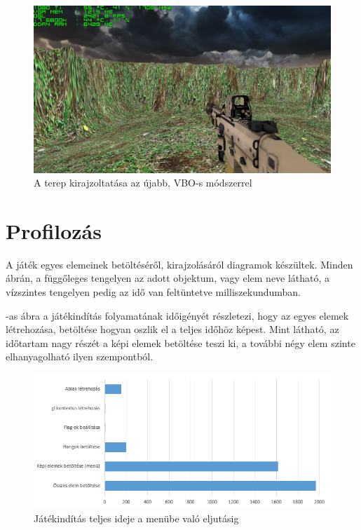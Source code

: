 \begin{figure}[h]
\centering
\includegraphics[scale=0.38]{kepek/vbo_method_fps.png}
\caption{A terep kirajzoltatása az újabb, VBO-s módszerrel}
\label{fig:vbo_fps}
\end{figure}

\section{Profilozás}

A játék egyes elemeinek betöltéséről, kirajzolásáról diagramok készültek. Minden ábrán, a függőleges tengelyen az adott objektum, vagy elem neve látható, a vízszintes tengelyen pedig az idő van feltüntetve milliszekundumban.

-as ábra a játékindítás folyamatának időigényét részletezi, hogy az egyes elemek létrehozása, betöltése hogyan oszlik el a teljes időhöz képest. Mint látható, az időtartam nagy részét a képi elemek betöltése teszi ki, a további négy elem szinte elhanyagolható ilyen szempontból.

\begin{figure}[h]
\centering
\includegraphics[scale=0.84]{kepek/start_diag.png}
\caption{Játékindítás teljes ideje a menübe való eljutásig}
\label{fig:start_diag}
\end{figure}

